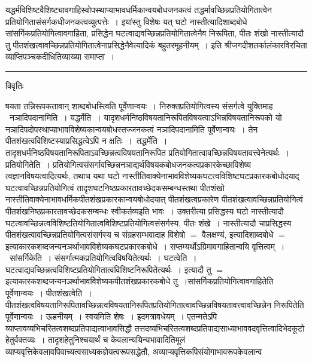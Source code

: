 \documentclass[10pt, openany]{book}
\begin{document}
{{\la यद्धर्मविशिष्टवैशिष्ट्यावगाहिस्वोपस्थाप्याभावधर्मिकान्वयबोधजनकत्वं तद्धर्मावच्छिन्नप्रतियोगितात्वेन प्रतियोगितासंसर्गकधीजनकत्वव्युत्पत्तेः~। इयांस्तु विशेषः यत् घटो नास्तीत्यादिशाब्दबोधे सांसर्गिकप्रतियोगित्वावगाहिता, प्रसिद्धेन घटत्वाद्यवच्छिन्नप्रतियोगितात्वेनैव निरूपिता, पीतः शंखो नास्तीत्यादौ
तु पीतशंखत्वावच्छिन्नप्रतियोगितात्वेनाप्रसिद्धेनैवेत्यादिकं बहुतरमूहनीयम्~। इति श्रीजगदीशतर्कालंकारविरचिता व्याप्तिपञ्चकदीधितिव्याख्या समाप्ता~।}\\
\hrule
\begin{center}     विवृतिः \end{center}
षयता तन्निरूपकतावान् शाब्दबोधस्त्विति पूर्वेणान्वयः~। निरुक्तप्रतियोगित्वस्य संसर्गत्वे युक्तिमाह \textendash\ {\la नञादिपदानामिति~।} यद्धर्मेति~। यादृशधर्मनिष्ठविषयतानिरूपितविषयत्वाऽभिन्नविषयतानिरूपको यो नञादिपदोपस्थाप्याभावविशेष्यकान्वयबोधस्तज्जनकत्वं नञादिपदानामिति पूर्वेणान्वयः~। तेन पीतशंखत्वविशिष्टस्याप्रसिद्धत्वेऽपि न क्षतिः~।~{\la तद्धर्मेति~।} तादृशधर्मनिष्ठविषयतानिरूपिताऽवच्छिन्नत्वविषयतानिरूपित प्रतियोगितात्वावच्छिन्नविषयतावत्त्वेनेत्यर्थः~। {\la प्रतियोगितेति~।} प्रतियोगित्वसंसर्गावच्छिन्ननञाद्यर्थविषयकबोधजनकत्वप्रकारकेच्छाविशेष्य त्वज्ञानविषयत्वादित्यर्थः, तथाच यथा घटो
नास्तीतिवाक्येनाभावविशेष्यकघटत्वविशिष्टघटप्रकारकबोधोदयाद् घटत्वावच्छिन्नप्रतियोगित्वं तादृशघटनिष्ठप्रकारतावच्छेदकसम्बन्धस्तथा पीतशंखो नास्तीतिवाक्येनाभावधर्मिकपीतशंखप्रकारकान्वयबोधोदयात् पीतशंखत्वप्रकारेण पीतशंखत्वावच्छिन्नप्रतियोगित्वं पीतशंखनिष्ठप्रकारतावच्छेदकसम्बन्धः स्वीकर्तव्यइति भावः~। उक्तरीत्या प्रसिद्धस्य घटो नास्तीत्यादौ घटत्वावच्छिन्नत्वविशिष्टतियोगितात्वविशिष्टप्रतियोगित्वसंसर्गस्य, पीतः शंखे~। नास्तीत्यादौ चाप्रसिद्धस्य
पीतशंखत्वावच्छिन्नप्रतियोगित्वसंसर्गस्य च संग्रहसम्भवादाह विशेषो $=$ वैलक्षण्यं, इत्यादिशाब्दबोधे $=$ इत्याकारकशब्दजन्यनञर्थाभावविशेष्यकघटप्रकारकबोधे~। सप्तम्यर्थोऽग्रिमावगाहितान्वयि वृत्तित्वम्~।~{\la सांसर्गिकेति~।} संसर्गात्मकप्रतियोगित्वविषयितेत्यर्थः~। घटत्वेति~। घटत्वाद्यवच्छिन्नत्वविशिष्टप्रतियोगितात्वविशिष्टनिरूपितेत्यर्थः~। इत्यादौ तु $=$ इत्याकारकशब्दजन्यनञर्थाभावविेशेष्यकपीतशंखप्रकारकबोधे तु~।सांसर्गिकप्रतियोगित्वावगाहितेति पूर्वेणान्वयः~। {\qt पीतशंखत्वेति}~।पीतशंखत्वविषयतानिरूपितावच्छिन्नत्वविषयतानिरूपितप्रतियोगितात्वावच्छिन्नविषयतावत्त्वावच्छिन्नेन निरूपितेति पूर्वेणान्वयः~। {\qt ऊहनीयम्~}। स्वयमिति
शेषः~। इदमत्रावधेयम्~। एतन्मतेऽपि व्याप्तावव्यभिचरितत्वशब्दप्रतिपाद्यत्वाभावसिद्धौ तत्तदव्यभिचरितत्वशब्दप्रतिपाद्यसाध्याभाववदवृत्तित्वादिभेदकूटो हेतुर्वक्तव्यः~। तादृशहेतुनिश्चयार्थं च केवलान्ययिन्यभावादितिमूलं व्याप्यवृत्तिकेवलावपिवाच्यत्वसाध्यकज्ञेयत्वरूपसद्धेतौ, अव्याप्यवृत्तिकपिसंयोगाभावरूपकेवलान्व
}
\end{document}
